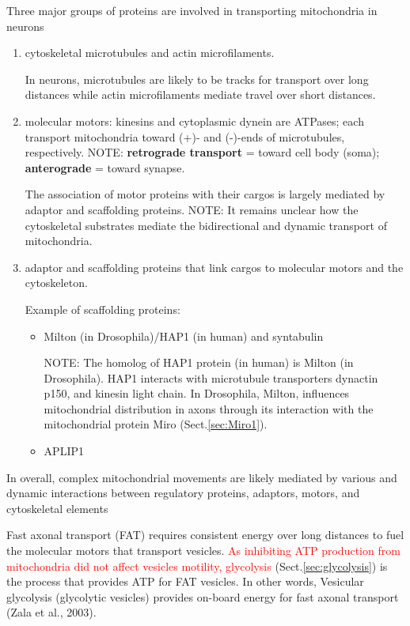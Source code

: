 Three major groups of proteins are involved in transporting mitochondria in
neurons
\begin{enumerate}

  \item  cytoskeletal microtubules and actin microfilaments.

In neurons, microtubules are likely to be tracks for transport over long
distances while actin microfilaments mediate travel over short distances.

  \item molecular motors: kinesins and cytoplasmic dynein are ATPases;
  each transport mitochondria toward (+)- and (-)-ends of microtubules,
  respectively. NOTE: {\bf retrograde transport} = toward cell body
  (soma); {\bf anterograde} = toward synapse.

The association of motor proteins with their cargos is largely mediated by
adaptor and scaffolding proteins. NOTE: It remains unclear how the cytoskeletal
substrates mediate the bidirectional and dynamic transport of mitochondria.

  \item adaptor and scaffolding proteins that link cargos to molecular motors
  and the cytoskeleton.

Example of scaffolding proteins:
\begin{itemize}
  \item Milton (in Drosophila)/HAP1 (in human) and syntabulin

NOTE: The homolog of HAP1 protein (in human) is Milton (in Drosophila).
HAP1 interacts with microtubule transporters dynactin p150, and kinesin light
chain. In Drosophila, Milton, influences mitochondrial distribution in axons
through its interaction with the mitochondrial protein Miro
(Sect.\ref{sec:Miro1}).


  \item APLIP1
\end{itemize}
\end{enumerate}
In overall, complex mitochondrial movements are likely mediated by various and
dynamic interactions between regulatory proteins, adaptors, motors, and
cytoskeletal elements

Fast axonal transport (FAT) requires consistent energy over long distances to
fuel the molecular motors that transport vesicles. \textcolor{red}{As inhibiting
ATP production from mitochondria did not affect vesicles motility, glycolysis}
(Sect.\ref{sec:glycolysis}) is the process that provides ATP for FAT vesicles.
In other words, Vesicular glycolysis (glycolytic vesicles) provides on-board
energy for fast axonal transport (Zala et al., 2003).



